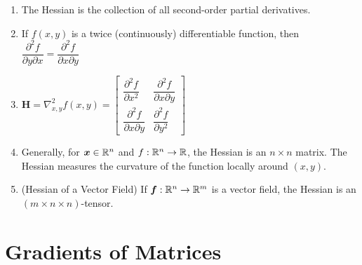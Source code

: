 \begin{enumerate}
    \item 
    \begin{definition}[Hessian ($\bm{H} = \nabla^2_{x,y}f(x,y)$)]    
        The Hessian is the collection of all second-order partial derivatives.
        \hfill \cite{mfml/book/mml/Deisenroth-Faisal-Ong}
    \end{definition}

    \item If $f (x, y)$ is a twice (continuously) differentiable function, then 
    $
        \dfrac{\partial^2 f}{\partial y \partial x}
        = \dfrac{\partial^2 f}{\partial x \partial y}
    $
    \hfill \cite{mfml/book/mml/Deisenroth-Faisal-Ong}

    \item 
    $
        \bm{H}
        = \nabla^2_{x,y}f(x,y)
        = \begin{bmatrix}
            \dfrac{\partial^2 f}{\partial x^2} & \dfrac{\partial^2 f}{\partial x \partial y} \\
            \dfrac{\partial^2 f}{\partial x \partial y} & \dfrac{\partial^2 f}{\partial y^2}
        \end{bmatrix}
    $
    \hfill \cite{mfml/book/mml/Deisenroth-Faisal-Ong}

    \item Generally, for $\bm{x} \in \mathbb{R}^n$ and $f : \mathbb{R}^n \to \mathbb{R}$, the Hessian is an $n \times n$ matrix. 
    The Hessian measures the curvature of the function locally around $(x, y)$.
    \hfill \cite{mfml/book/mml/Deisenroth-Faisal-Ong}

    \item (Hessian of a Vector Field) If $\bm{f} : \mathbb{R}^n \to \mathbb{R}^m$ is a vector field, the Hessian is an $(m \times n \times n)$-tensor. 
    \hfill \cite{mfml/book/mml/Deisenroth-Faisal-Ong}
\end{enumerate}














\section{Gradients of Matrices}


